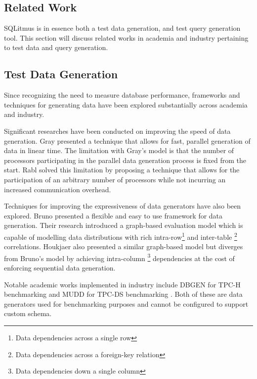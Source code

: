 \documentclass[12pt]{report}
\begin{document}
\begin{spacing}{1.9}
		
		
		
		
		
		
		\chapter{Related Work}
		SQLitmus is in essence both a test data generation, and test query generation tool. This section will discuss related works in academia and industry pertaining to test data and query generation.
		
		\section{Test Data Generation}
		
		Since recognizing the need to measure database performance, frameworks and techniques for generating data have been explored substantially across academia and industry.
		
		Significant researches have been conducted on improving the speed of data generation. Gray \cite{Gray:1994} presented a technique that allows for fast, parallel generation of data in linear time. The limitation with Gray's model is that the number of processors participating in the parallel data generation process is fixed from the start. Rabl \cite{Rabl:2010} solved this limitation by proposing a technique that allows for the participation of an arbitrary number of processors while not incurring an increased communication overhead.
		
		Techniques for improving the expressiveness of data generators have also been explored. Bruno \cite{Bruno:2005} presented a flexible and easy to use framework for data generation. Their research introduced a graph-based evaluation model which is capable of modelling data distributions with rich intra-row\footnote{Data dependencies across a single row} and inter-table \footnote{Data dependencies across a foreign-key relation} correlations. Houkjaer\cite{Houkjaer:2006} also presented a similar graph-based model but diverges from Bruno's\cite{Bruno:2005} model by achieving intra-column \footnote{Data dependencies down a single column} dependencies at the cost of enforcing sequential data generation. 
		
		Notable academic works implemented in industry include DBGEN for TPC-H benchmarking \cite{Poess:2000} and MUDD for TPC-DS benchmarking \cite{Stephens:2004}. Both of these are data generators used for benchmarking purposes and cannot be configured to support custom schema. 
		

\end{spacing}
\end{document}
